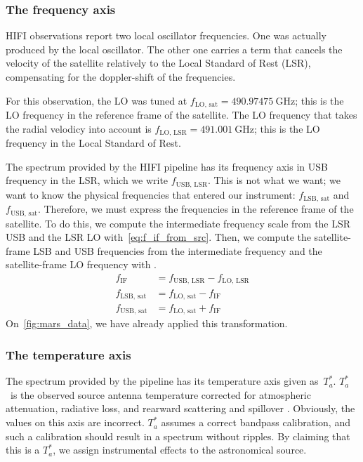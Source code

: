 \subsubsection{The frequency axis}
HIFI observations report two local oscillator frequencies.
One was actually produced by the local oscillator.
The other one carries a term that cancels the velocity of the satellite relatively to the Local Standard of Rest (LSR), compensating for the doppler-shift of the frequencies.

For this observation, the LO was tuned at
$f_\text{LO, sat} = \SI{490.97475}{\giga\hertz}$;
this is the LO frequency in the reference frame of the satellite.
The LO frequency that takes the radial velodicy into account is
$f_\text{LO, LSR} = \SI{491.001}{\giga\hertz}$;
this is the LO frequency in the Local Standard of Rest.

The spectrum provided by the HIFI pipeline has its frequency axis in USB frequency in the LSR, which we write $f_\text{USB, LSR}$.
This is not what we want; we want to know the physical frequencies that entered our instrument: $f_\text{LSB, sat}$ and $f_\text{USB, sat}$.
Therefore, we must express the frequencies in the reference frame of the satellite.
To do this, we compute the intermediate frequency scale from the LSR USB and the LSR LO with~\cref{eq:f_if_from_src}.
Then, we compute the satellite-frame LSB and USB frequencies from the intermediate frequency and the satellite-frame LO frequency with .
\begin{align}
    f_\text{IF} &= f_\text{USB, LSR} - f_\text{LO, LSR} \label{eq:f_if_from_src} \\
    f_\text{LSB, sat} &= f_\text{LO, sat} - f_\text{IF} \label{eq:f_lsb_sat}\\
    f_\text{USB, sat} &= f_\text{LO, sat} + f_\text{IF} \label{eq:f_usb_sat}
\end{align}
On~\cref{fig:mars_data}, we have already applied this transformation.

\subsubsection{The temperature axis}
The spectrum provided by the pipeline has its temperature axis given as~$T_a^*$.
$T_a^*$~is the observed source antenna temperature corrected for atmospheric attenuation,
radiative loss, and rearward scattering and spillover \cite{mangum2006tempscales}.
Obviously, the values on this axis are incorrect.
$T_a^*$ assumes a correct bandpass calibration, and such a calibration should result in a spectrum without ripples.
By claiming that this is a $T_a^*$, we assign instrumental effects to the astronomical source.

